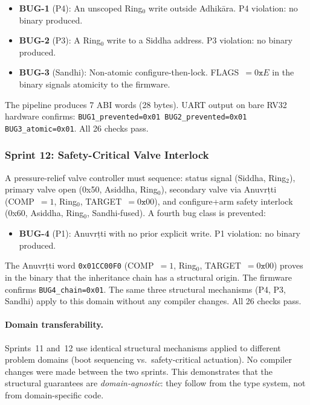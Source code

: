 \documentclass[11pt,a4paper]{article}
\begin{document}
\begin{itemize}
\item \textbf{BUG-1} (P4): An unscoped Ring$_0$ write outside Adhi\-k\={a}ra.
  P4 violation: no binary produced.
\item \textbf{BUG-2} (P3): A Ring$_0$ write to a Siddha address.
  P3 violation: no binary produced.
\item \textbf{BUG-3} (Sandhi): Non-atomic configure-then-lock.
  FLAGS~$= 0\texttt{x}E$ in the binary signals atomicity to the firmware.
\end{itemize}

The pipeline produces 7 ABI words (28 bytes). UART output on bare RV32
hardware confirms: \texttt{BUG1\_prevented=0x01 BUG2\_prevented=0x01
BUG3\_atomic=0x01}. All 26 checks pass.

\subsubsection{Sprint 12: Safety-Critical Valve Interlock}

A pressure-relief valve controller must sequence: status signal (Siddha,
Ring$_2$), primary valve open (0x50, Asiddha, Ring$_0$), secondary valve via
Anuvr\d{t}ti (COMP~$= 1$, Ring$_0$, TARGET~$= 0\texttt{x}00$), and
configure+arm safety interlock (0x60, Asiddha, Ring$_0$, Sandhi-fused). A
fourth bug class is prevented:

\begin{itemize}
\item \textbf{BUG-4} (P1): Anuvr\d{t}ti with no prior explicit write.
  P1 violation: no binary produced.
\end{itemize}

The Anuvr\d{t}ti word \texttt{0x01CC00F0} (COMP~$= 1$, Ring$_0$,
TARGET~$= 0\texttt{x}00$) proves in the binary that the inheritance chain has
a structural origin. The firmware confirms \texttt{BUG4\_chain=0x01}. The
same three structural mechanisms (P4, P3, Sandhi) apply to this domain
without any compiler changes. All 26 checks pass.

\paragraph{Domain transferability.}
Sprints~11 and~12 use identical structural mechanisms applied to different
problem domains (boot sequencing vs.\ safety-critical actuation). No compiler
changes were made between the two sprints. This demonstrates that the
structural guarantees are \emph{domain-agnostic}: they follow from the type
system, not from domain-specific code.
\end{document}
